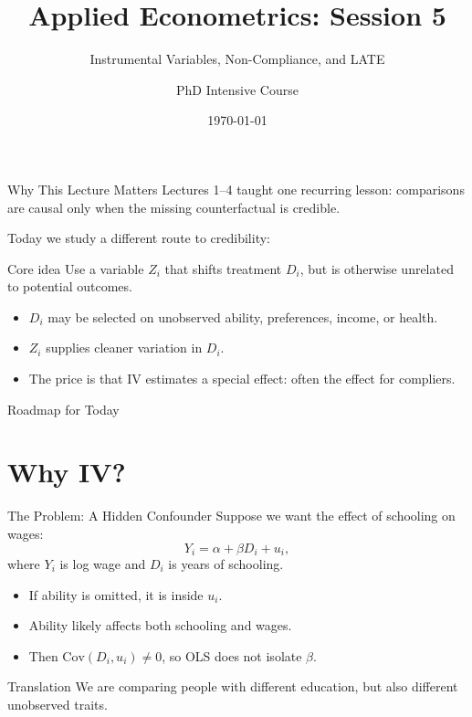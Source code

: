 \documentclass[11pt,aspectratio=169]{beamer}
\title{Applied Econometrics: Session 5}
\subtitle{Instrumental Variables, Non-Compliance, and LATE}
\author{PhD Intensive Course}
\institute{Lecture 5}
\date{\today}
\newcommand{\Cov}{\mathrm{Cov}}
\begin{document}
\begin{frame}
  \titlepage
\end{frame}

\begin{frame}{Why This Lecture Matters}
  Lectures 1--4 taught one recurring lesson: comparisons are causal only when the missing counterfactual is credible.
  \vspace{0.4em}

  Today we study a different route to credibility:
  \begin{block}{Core idea}
    Use a variable \(Z_i\) that shifts treatment \(D_i\), but is otherwise unrelated to potential outcomes.
  \end{block}

  \begin{itemize}
    \item \(D_i\) may be selected on unobserved ability, preferences, income, or health.
    \item \(Z_i\) supplies cleaner variation in \(D_i\).
    \item The price is that IV estimates a special effect: often the effect for compliers.
  \end{itemize}
\end{frame}

\begin{frame}{Roadmap for Today}
  \tableofcontents
\end{frame}

\section{Why IV?}

\begin{frame}{The Problem: A Hidden Confounder}
  Suppose we want the effect of schooling on wages:
  \[
    Y_i = \alpha + \beta D_i + u_i,
  \]
  where \(Y_i\) is log wage and \(D_i\) is years of schooling.

  \begin{itemize}
    \item If ability is omitted, it is inside \(u_i\).
    \item Ability likely affects both schooling and wages.
    \item Then \(\Cov(D_i,u_i)\neq 0\), so OLS does not isolate \(\beta\).
  \end{itemize}

  \begin{block}{Translation}
    We are comparing people with different education, but also different unobserved traits.
  \end{block}
\end{frame}
\end{document}
